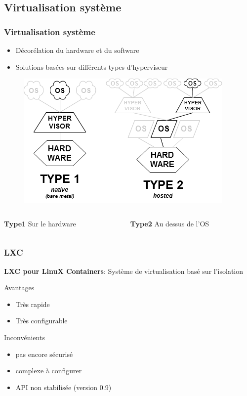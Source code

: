 \documentclass{beamer}
\begin{document}
		\subsection{Virtualisation système}
			\begin{frame}
			  \frametitle{Virtualisation système}
			  \begin{itemize}
   			  \item Décorélation du hardware et du software
			    \item Solutions basées sur différents types d'hyperviseur
			  \end{itemize}
        \begin{figure}
			    \includegraphics[scale=0.5]{img/Hyperviseur.png}
 			  \end{figure}
 			  \begin{columns}
          \begin{column}{.48\textwidth}
			      \textbf{Type1} Sur le hardware
			    \end{column}
          \hfill
          \begin{column}{.48\textwidth}
            \textbf{Type2} Au dessus de l'OS
          \end{column}
        \end{columns}
			\end{frame}
			
			\begin{frame}
				\frametitle{LXC}
				\textbf{LXC pour LinuX Containers}: Système de virtualisation basé sur l'isolation
				\begin{exampleblock}{Avantages}
				  \begin{itemize}
				    \item Très rapide
				    \item Très configurable
				  \end{itemize}
				\end{exampleblock}
				\begin{alertblock}{Inconvénients}
				  \begin{itemize}
				    \item pas encore sécurisé
				    \item complexe à configurer
				    \item API non stabilisée (version 0.9)
				  \end{itemize}
				\end{alertblock}
			\end{frame}
	
\end{document}
